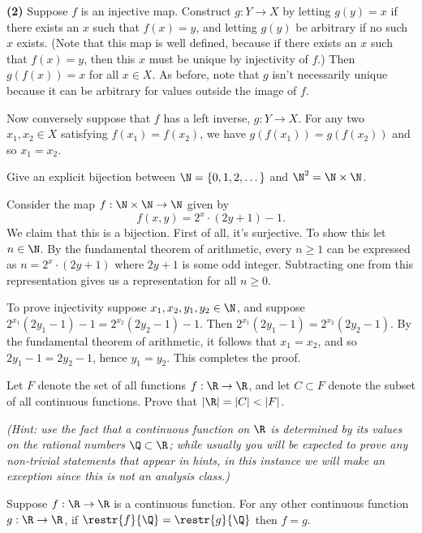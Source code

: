 \documentclass[11pt,letterpaper]{article}
\begin{document}
\textbf{(2)} Suppose $f$ is an injective map. Construct $g : Y \to X$ by letting $g(y) = x$ if there exists an $x$ such that $f(x)=y$, and letting $g(y)$ be arbitrary if no such $x$ exists. (Note that this map is well defined, because if there exists an $x$ such that $f(x)=y$, then this $x$ must be unique by injectivity of $f$.) Then $g(f(x)) = x$ for all $x\in X$. As before, note that $g$ isn't necessarily unique because it can be arbitrary for values outside the image of $f$. 

Now conversely suppose that $f$ has a left inverse, $g : Y \to X$. For any two $x_1, x_2 \in X$ satisfying $f(x_1) = f(x_2)$, we have $g(f(x_1)) = g(f(x_2))$ and so $x_1=x_2$. 

\pagebreak
\begin{problem}
  Give an explicit bijection between $\N=\{0,1,2,\dots\}$ and
  $\N^2=\N\times\N$.
\end{problem}

Consider the map $f : \N\times\N \to \N$ given by 
\[f(x,y) = 2^x\cdot (2y+1)-1.\] 
We claim that this is a bijection. First of all, it's surjective. To show this let $n\in \N$. By the fundamental theorem of arithmetic, every $n\geq 1$ can be expressed as $n=2^x\cdot(2y+1)$ where $2y+1$ is some odd integer. Subtracting one from this representation gives us a representation for all $n\geq 0$. 

To prove injectivity suppose $x_1,x_2,y_1,y_2\in \N$, and suppose $2^{x_1}(2y_1-1)-1=2^{x_2}(2y_2-1)-1$. Then $2^{x_1}(2y_1-1)=2^{x_2}(2y_2-1)$. By the fundamental theorem of arithmetic, it follows that $x_1=x_2$, and so $2y_1-1=2y_2-1$, hence $y_1=y_2$. This completes the proof.      


\pagebreak
\begin{problem} 
  Let $F$ denote the set of all functions $f:\R\to\R$, and let $C\subset F$ denote the subset of all continuous functions. Prove that $|\R|=|C|<|F|$.
\end{problem}

\textit{(Hint: use the fact that a continuous function on $\R$ is determined by its values on the rational numbers $\Q\subset\R$; while usually you will be expected to prove any non-trivial statements that appear in hints, in this instance we will make an exception since this is not an analysis class.)}

\begin{theorem}[Hint]\label{hinttheorem}
  Suppose $f : \R \to \R$ is a continuous function. For any other continuous function $g : \R \to \R$, if $\restr{f}{\Q} = \restr{g}{\Q}$ then $f = g$.
\end{theorem}
\end{document}
